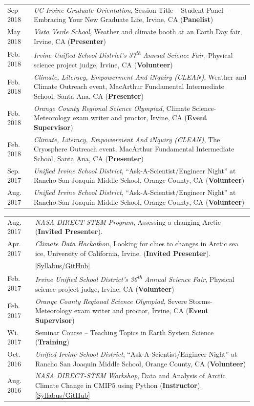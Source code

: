 \documentclass[margin,line,palatino,courier,10pt]{res}
\begin{document}
\begin{resume}
\begin{tabular}{@{}p{0.9in}p{4in}}
Sep 2018 & \textit{UC Irvine Graduate Orientation}, Session Title -- Student Panel -- Embracing Your New Graduate Life, Irvine, CA (\textbf{Panelist})\\
May 2018 & \textit{Vista Verde School}, Weather and climate booth at an Earth Day fair, Irvine, CA (\textbf{Presenter})\\
Feb. 2018 & \textit{Irvine Unified School District's 37\textsuperscript{th} Annual Science Fair}, Physical science project judge, Irvine, CA (\textbf{Volunteer})\\
Feb. 2018 & \textit{Climate, Literacy, Empowerment And iNquiry (CLEAN)}, Weather and Climate Outreach event, MacArthur Fundamental Intermediate School, Santa Ana, CA (\textbf{Presenter})\\
Feb. 2018 & \textit{Orange County Regional Science Olympiad}, Climate Science-Meteorology exam writer and proctor, Irvine, CA (\textbf{Event Supervisor})\\
Feb. 2018 & \textit{Climate, Literacy, Empowerment And iNquiry (CLEAN)}, The Cryosphere Outreach event, MacArthur Fundamental Intermediate School, Santa Ana, CA (\textbf{Presenter})\\
Sep. 2017 & \textit{Unified Irvine School District}, ``Ask-A-Scientist/Engineer Night'' at Rancho San Joaquin Middle School, Orange County, CA (\textbf{Volunteer})\\
Aug. 2017 & \textit{Unified Irvine School District}, ``Ask-A-Scientist/Engineer Night'' at Rancho San Joaquin Middle School, Orange County, CA (\textbf{Volunteer})\\
\end{tabular}
\begin{tabular}{@{}p{0.9in}p{4in}}
Aug. 2017 & \textit{NASA DIRECT-STEM Program}, Assessing a changing Arctic (\textbf{Invited Presenter}).\\
Apr. 2017 & \textit{Climate Data Hackathon}, Looking for clues to changes in Arctic 
sea ice, University of California, Irvine. (\textbf{Invited Presenter}).\\ & \href{https://github.com/UCIDataScienceInitiative/Climate_Hackathon}{[Syllabus/GitHub]}\\
Feb. 2017 & \textit{Irvine Unified School District's 36\textsuperscript{th} Annual Science Fair}, Physical science project judge, Irvine, CA (\textbf{Volunteer})\\
Feb. 2017 & \textit{Orange County Regional Science Olympiad}, Severe Storms-Meteorology exam writer and proctor, Irvine, CA (\textbf{Event Supervisor})\\
Wi. 2017 & Seminar Course -- Teaching Topics in Earth System Science (\textbf{Training})\\
Oct. 2016 & \textit{Unified Irvine School District}, ``Ask-A-Scientist/Engineer Night'' at Rancho San Joaquin Middle School, Orange County, CA (\textbf{Volunteer})\\
Aug. 2016 & \textit{NASA DIRECT-STEM Workshop}, Data and Analysis of Arctic Climate Change in CMIP$5$ using Python (\textbf{Instructor}). \href{https://github.com/strongh/DIRECT-STEM-climate-workshop}{[Syllabus/GitHub]}\\
\end{tabular}


\end{resume}
\end{document}
